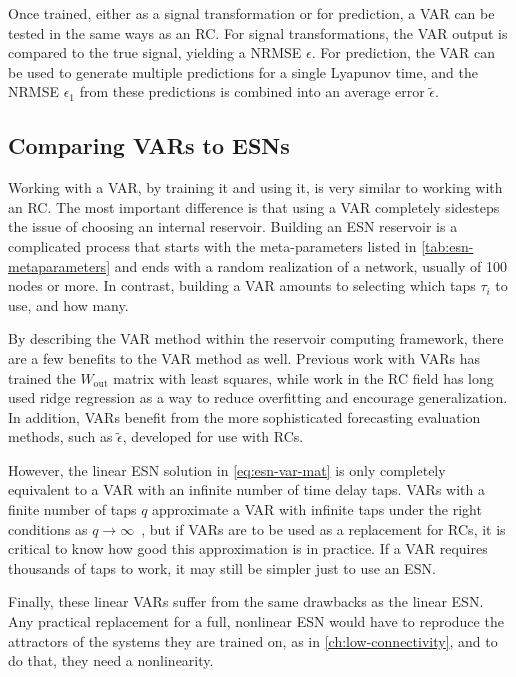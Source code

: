 Once trained, either as a signal transformation or for prediction, a
VAR can be tested in the same ways as an RC. For signal
transformations, the VAR output is compared to the true signal,
yielding a NRMSE $\epsilon$. For prediction, the VAR can be used to
generate multiple predictions for a single Lyapunov time, and the
NRMSE $\epsilon_1$ from these predictions is combined into an average
error $\tilde{\epsilon}$.

\subsection{Comparing VARs to ESNs}

Working with a VAR, by training it and using it, is very similar to
working with an RC. The most important difference is that using a VAR
completely sidesteps the issue of choosing an internal
reservoir. Building an ESN reservoir is a complicated process that
starts with the meta-parameters listed in \cref{tab:esn-metaparameters}
and ends with a random realization of a network, usually of 100 nodes
or more. In contrast, building a VAR amounts to selecting which taps
$\tau_i$ to use, and how many.

By describing the VAR method within the reservoir computing framework,
there are a few benefits to the VAR method as well. Previous work with
VARs has trained the $W_\text{out}$ matrix with least squares, while
work in the RC field has long used ridge regression as a way to reduce
overfitting and encourage generalization. In addition, VARs benefit
from the more sophisticated forecasting evaluation methods, such as
$\tilde{\epsilon}$, developed for use with RCs.

However, the linear ESN solution in \cref{eq:esn-var-mat} is only
completely equivalent to a VAR with an infinite number of time delay
taps. VARs with a finite number of taps $q$ approximate a VAR
with infinite taps under the right conditions as $q \rightarrow
\infty$~\cite{bollt2021}, but if VARs are to be used as a replacement
for RCs, it is critical to know how good this approximation is in
practice. If a VAR requires thousands of taps to work, it may still
be simpler just to use an ESN.

Finally, these linear VARs suffer from the same drawbacks as the
linear ESN. Any practical replacement for a full, nonlinear ESN would have to
reproduce the attractors of the systems they are trained on, as in
\cref{ch:low-connectivity}, and to do that, they need a nonlinearity.

